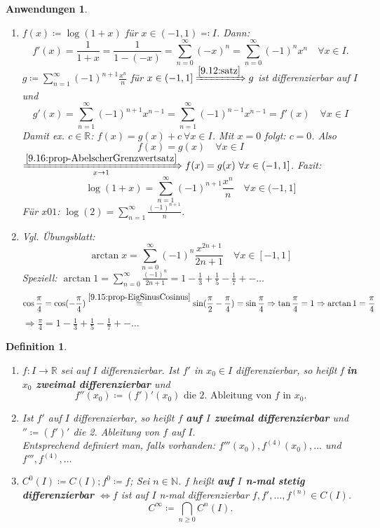 \documentclass[14pt,titlepage,ngerman,a4paper,headsepline,DIV15,halfparskip*]{scrartcl}
\newcommand{\N}{\mathbb{N}}
\newcommand{\R}{\mathbb{R}}
\theoremstyle{named}
\theoremstyle{dotless}
\newtheorem{anwendungen}[namedtheorem]{Anwendungen}
\newtheorem*{definition}{Definition}
\begin{document}

\begin{anwendungen} ~\ \label{9.17:anwendungen}
	\begin{enumerate}
		\item $f(x) \coloneqq \log(1+x)$ für $x \in (-1, 1) \eqqcolon I$. Dann: \label{9.17.a:anwendungen}
			$$ f'(x) = \frac{1}{1+x} = \frac{1}{1 - (-x)} = \sum_{n=0}^{\infty} (-x)^{n} = \sum_{n=0}^{\infty} (-1)^{n} x^{n} \quad \forall x \in I. $$
			$g \coloneqq \sum_{n=1}^{\infty} (-1)^{n+1} \frac{x^{n}}{n}$ für $x \in (-1, 1] \xRightarrow[]{\ref{9.12:satz}} g$ ist differenzierbar auf $I$ und 
			$$ g'(x) = \sum_{n=1}^{\infty} (-1)^{n+1} x^{n-1} = \sum_{n=1}^{\infty} (-1)^{n-1} x^{n-1} = f'(x) \quad \forall x \in I $$
			Damit ex. $c \in \R$: $f(x) = g(x) + c ~\forall x \in I$. Mit $x = 0$ folgt: $c = 0$. Also
			$$ f(x) = g(x) \quad \forall x \in I $$
			$\xRightarrow[x \rightarrow 1]{\ref{9.16:prop-AbelscherGrenzwertsatz}} f(x) = g(x) ~\forall x \in (-1, 1]$. Fazit:
			$$ \log(1+x) = \sum_{n=1}^{\infty} (-1)^{n+1} \frac{x^{n}}{n} \quad \forall x \in (-1 , 1] $$
			Für $x 0 1$: $\log(2) = \sum_{n=1}^{\infty} \frac{(-1)^{n+1}}{n}$. 
		\item Vgl. Übungsblatt: \label{9.17.b:anwendungen}
			$$ \arctan x = \sum_{n=0}^{\infty} (-1)^{n} \frac{x^{2n +1}}{2n + 1} \quad \forall x \in [-1, 1] $$
			Speziell: $\arctan 1 = \sum_{n=0}^{\infty} \frac{(-1)^{n}}{2n + 1} = 1 - \frac{1}{3} + \frac{1}{5} - \frac{1}{7} +- \dotsc$
		$$ \cos \frac{\pi}{4} = \cos(-\frac{\pi}{4}) \overset{\ref{9.15:prop-EigSinusCosinus}}{=} \sin( \frac{\pi}{2} - \frac{\pi}{4}) = \sin \frac{\pi}{4} \Rightarrow \tan \frac{\pi}{4} = 1 \Rightarrow \arctan 1 = \frac{\pi}{4} $$
		$\Rightarrow \frac{\pi}{4} = 1 - \frac{1}{3} + \frac{1}{5} - \frac{1}{7} +- \dotsc$
	\end{enumerate}
\end{anwendungen}

   
\begin{definition} ~\
	\begin{enumerate}
		\item $f \colon I \rightarrow \R$ sei auf $I$ differenzierbar. Ist $f'$ in $x_{0} \in I$ differenzierbar, so hei{\ss}t f \textbf{in $x_{0}$ zweimal differenzierbar} und
		$$ f''(x_{0}) \coloneqq (f')'(x_{0}) \text{ die 2. Ableitung von $f$ in $x_{0}$.} $$
		\item Ist $f'$ auf $I$ differenzierbar, so hei{\ss}t $f$ \textbf{auf $I$ zweimal differenzierbar} und $'' \coloneqq (f')'$ die 2. Ableitung von $f$ auf $I$. \\
			Entsprechend definiert man, falls vorhanden: $f'''(x_{0}), f^{(4)}(x_{0}), \dotsc$ und $f''', f^{(4)}, \dotsc$ 
		\item $C^{0}(I) \coloneqq C(I); f^{0} \coloneqq f$; Sei $n \in \N$. $f$ hei{\ss}t \textbf{auf $I$ n-mal stetig differenzierbar} $\iff f$ ist auf $I$ n-mal differenzierbar $f, f', \dotsc, f^{(n)} \in C(I)$.
			$$ C^{\infty} \coloneqq \bigcap_{n \geq 0} C^{n}(I). $$
	\end{enumerate}
\end{definition}
\end{document}
